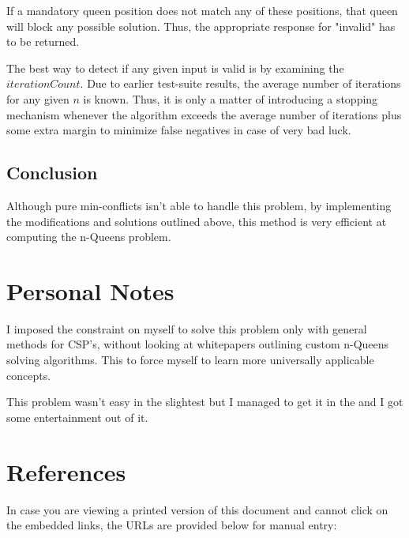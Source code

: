 \documentclass{article}
\begin{document}
If a mandatory queen position does not match any of these positions, that queen will block any possible solution.
Thus, the appropriate response for "invalid" has to be returned.

The best way to detect if any given input is valid is by examining the \(iterationCount\).
Due to earlier test-suite results, the average number of iterations for any given \(n\) is known.
Thus, it is only a matter of introducing a stopping mechanism whenever the algorithm exceeds the average number of iterations
plus some extra margin to minimize false negatives in case of very bad luck.

\subsection{Conclusion}
Although pure min-conflicts isn't able to handle this problem, by implementing the modifications and solutions outlined above,
this method is very efficient at computing the n-Queens problem.

\clearpage
\section{Personal Notes}
I imposed the constraint on myself to solve this problem only with general methods for CSP's,
without looking at whitepapers outlining custom n-Queens solving algorithms. This to force
myself to learn more universally applicable concepts.

This problem wasn't easy in the slightest but I managed to get it in the and I got some entertainment out of it.

\section*{References}
In case you are viewing a printed version of this document and cannot click on the embedded links, the URLs are provided below for manual entry:

\sloppy
\end{document}
